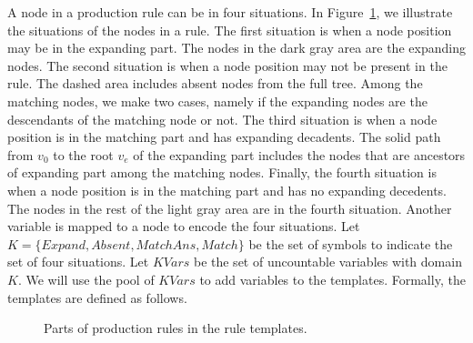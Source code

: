 A node in a production rule can be in four situations.
In Figure~\ref{fig:rule-parts}, we illustrate the situations of the nodes in a rule.
The first situation is when a node position may be in the expanding part.
The nodes in the dark gray area are the expanding nodes.
The second situation is when a node position may not be present in the rule.
The dashed area includes absent nodes
from the full tree.
Among the matching nodes, we make two cases, namely if the expanding
nodes are the descendants of the matching node or not. 
The third situation is when a node position is in the matching part
and has expanding decadents.
The solid path from $v_0$ to the root $v_e$ of the expanding part includes
the nodes that are ancestors of expanding part among the matching nodes.
Finally, the fourth situation is when a node position is in the matching part and
has no expanding decedents.
The nodes in the rest of the light gray area are in the fourth situation.
Another variable is mapped to a node to encode the four situations.
Let $K =\{Expand,Absent,MatchAns,Match\}$ be the set of symbols to
indicate the set of four situations.
Let $KVars$ be the set of uncountable variables with domain $K$. 
We will use the pool of $KVars$ to add variables to the templates.
Formally, the templates are defined as follows.

\begin{figure}[t]
        \center

  \caption{Parts of production rules in the rule templates.}
  \label{fig:rule-parts}
\end{figure}



